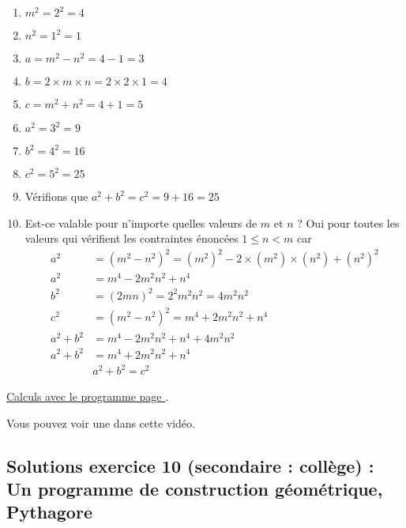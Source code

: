 \begin{enumerate}[label=C\arabic*)]
    \item \(m^2 = 2^2 =  4\)
    \item \(n^2 = 1^2 = 1\)
    \item \(a = m^2 - n^2 = 4 - 1 = 3\)
    \item \(b = 2 \times m \times n = 2\times 2\times 1 = 4\)
    \item \(c = m^2 + n^2 = 4 + 1 = 5\)
    \item \(a^2 = 3^2 = 9\)
    \item \(b^2 = 4^2 = 16\)
    \item \(c^2 = 5^2 = 25\)
    \item Vérifions que \( a^2 + b^2 = c^2 = 9 + 16 = 25\)
    \item Est-ce valable pour n'importe quelles valeurs de \(m\) et \(n\) ? Oui pour toutes les valeurs qui vérifient les contraintes énoncées $1\leq n < m$ car
    \begin{align*}
    	a^2 &= (m^2 - n^2)^2 = (m^2)^2 - 2\times (m^2)\times (n^2) + (n^2)^2 \\
	a^2 &= m^4 - 2m^2n^2 + n^4 \\
	b^2 &= (2mn)^2 = 2^2m^2n^2 = 4m^2n^2 \\
	c^2 &= (m^2 - n^2)^2 = m^4 + 2m^2n^2 + n^4 \\
	a^2 + b^2 &= m^4 - 2m^2n^2 + n^4 + 4m^2n^2 \\
	a^2 + b^2 &= m^4 + 2m^2n^2 + n^4\\
	&\boxed{a^2 + b^2 = c^2}
    \end{align*} 
\end{enumerate}

\hyperref[calc:niveau9]{Calculs avec le programme page \pageref{calc:niveau9}}.

Vous pouvez voir une  dans cette vidéo.

\newpage


\subsection{Solutions exercice 10 (secondaire : collège) : Un programme de construction géométrique, Pythagore}

\label{sol:niveau10}



